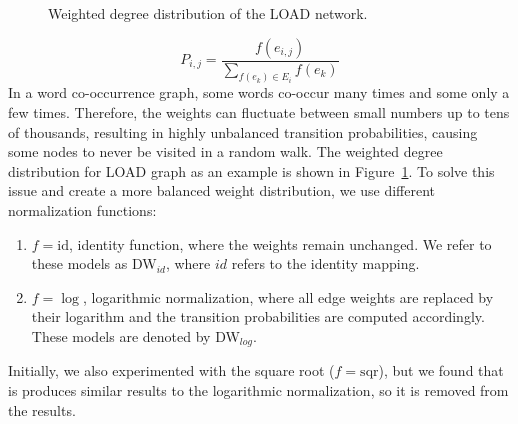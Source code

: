 \begin{figure}
\centering 
\resizebox{0.6\textwidth}{0.6\textwidth}{      

}
\caption{Weighted degree distribution of the LOAD network.}
\label{fig:degrees}
\end{figure}
\begin{equation}
P_{i,j}=\frac{f(e_{i,j})}{\sum _{ f(e_ k )\in E_{ i } }^{  }{ f(e_k) } }
\label{eq:edge_weight}
\end{equation}
In a word co-occurrence graph, some words co-occur many times and some only a few times. Therefore, the weights can fluctuate between small numbers up to tens of thousands, resulting in highly unbalanced transition probabilities, causing some nodes to never be visited in a random walk. The weighted degree distribution for LOAD graph as an example is shown in Figure~\ref{fig:degrees}. To solve this issue and create a more balanced weight distribution, we use different normalization functions:
\noindent
\begin{enumerate}
\item  $f=\mathrm{id}$, identity function, where the weights remain unchanged. We refer to these models as DW$_{id}$, where $id$ refers to the identity mapping.
\item  $f=\log$, logarithmic normalization, where all edge weights are replaced by their logarithm and the transition probabilities are computed accordingly. These models are denoted by DW$_{log}$.
\end{enumerate}
Initially, we also experimented with the square root ($f=\mathrm{sqr}$), but we found that is produces similar results to the logarithmic normalization, so it is removed from the results.\\

